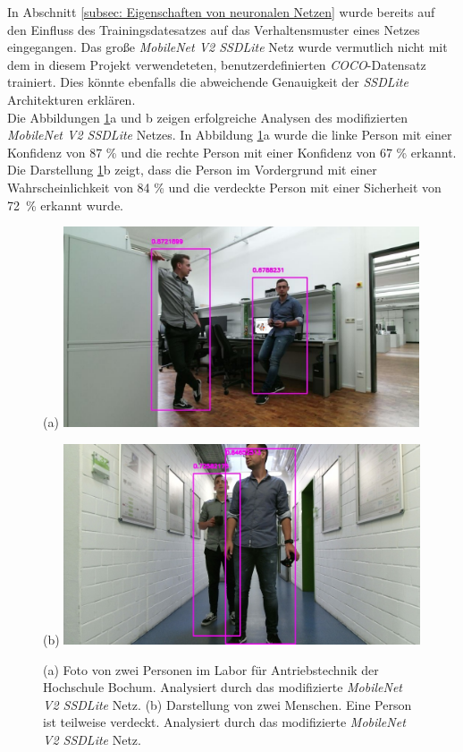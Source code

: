 In Abschnitt \ref{subsec: Eigenschaften von neuronalen Netzen} wurde bereits auf den Einfluss des Trainingsdatesatzes auf das Verhaltensmuster eines Netzes eingegangen. Das große \textit{MobileNet V2 SSDLite} Netz wurde vermutlich nicht mit dem in diesem Projekt verwendeteten, benutzerdefinierten \textit{COCO}-Datensatz trainiert. Dies könnte ebenfalls die abweichende Genauigkeit der \textit{SSDLite} Architekturen erklären.\\


Die Abbildungen \ref{fig: owndatat}a und b zeigen erfolgreiche Analysen des modifizierten \textit{MobileNet V2 SSDLite} Netzes. In Abbildung \ref{fig: owndatat}a wurde die linke Person mit einer Konfidenz von 87 \% und die rechte Person mit einer Konfidenz von 67 \% erkannt. Die Darstellung \ref{fig: owndatat}b zeigt, dass die Person im Vordergrund mit einer Wahrscheinlichkeit von 84 \% und die verdeckte Person mit einer Sicherheit von {72~\%} erkannt wurde.  \\

	\begin{figure}[H]
	\centering
	\begin{minipage}[b]{0.49\textwidth}
		(a)
		\includegraphics[width=0.94\textwidth]{Bilder/26t.pdf}
	\end{minipage}
	\hfill
	\begin{minipage}[b]{0.49\textwidth}
		(b)
		\includegraphics[width=0.94\textwidth]{Bilder/39t.jpg}
	\end{minipage}
	\caption{(a) Foto von zwei Personen im Labor für Antriebstechnik der Hochschule Bochum. Analysiert durch das modifizierte \textit{MobileNet V2 SSDLite} Netz. (b) Darstellung von zwei Menschen. Eine Person ist teilweise verdeckt. Analysiert durch das modifizierte \textit{MobileNet V2 SSDLite} Netz.}
	\label{fig: owndatat}
\end{figure}




